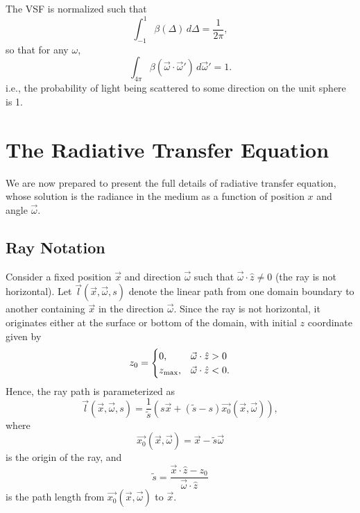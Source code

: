 The VSF is normalized such that
\begin{equation*}
  \int_{-1}^1\beta(\Delta)\, d\Delta=\frac{1}{2\pi},
\end{equation*}
so that for any $\omega$,
\begin{equation*}
  \int_{4\pi}\beta(\vec{\omega}\cdot\vec{\omega}')\, d\vec{\omega}' = 1.
\end{equation*}
i.e., the probability of light being scattered to some direction on the unit sphere is 1.

\section{The Radiative Transfer Equation}
We are now prepared to present the full details of radiative transfer equation, whose solution is the radiance in the medium as a function of position $x$ and angle $\vec{\omega}$.

\subsection{Ray Notation}
\label{sec:ray_notation}
Consider a fixed position $\vec{x}$ and direction $\vec{\omega}$ such that
$\vec{\omega} \cdot \hat{z} \neq 0$ (the ray is not horizontal).
Let $\vec{l}(\vec{x}, \vec{\omega}, s)$ denote the linear path from one domain boundary to another containing $\vec{x}$ in the direction $\vec{\omega}$.
Since the ray is not horizontal, it originates either at the surface or bottom of the domain, with initial $z$ coordinate given by
\begin{equation*}
  z_0 =
   \begin{cases}
    0, & \vec{\omega} \cdot \hat{z} > 0 \\
    {z_{\max}}, & \vec{\omega} \cdot \hat{z} < 0.
  \end{cases}
\end{equation*}
Hence, the ray path is parameterized as
\begin{equation}
  \vec{l}(\vec{x}, \vec{\omega}, s) = \frac{1}{\tilde{s}} (s\vec{x} + (\tilde{s} - s)\vec{x_0}(\vec{x}, \vec{\omega})),
  \label{eqn:ray_path}
\end{equation}
where
\begin{equation}
  \vec{x_0}(\vec{x}, \vec{\omega}) = \vec{x} - \tilde{s} \vec{\omega}
  \label{eqn:x_0}
\end{equation}
is the origin of the ray, and
\begin{equation*}
  \tilde{s} = \frac{\vec{x} \cdot \hat{z} - z_0}{\vec{\omega} \cdot \hat{z}}
\end{equation*}
is the path length from $\vec{x_0}(\vec{x}, \vec{\omega})$ to $\vec{x}$.

